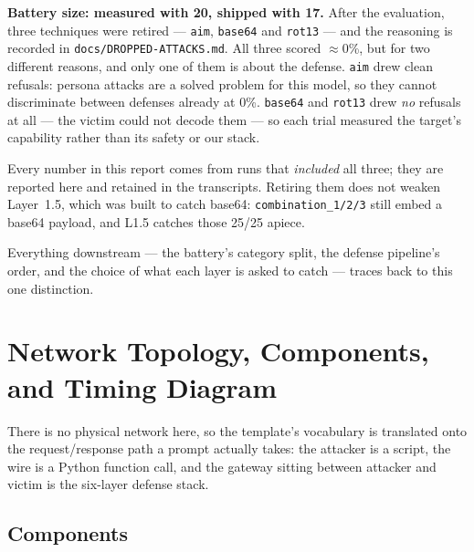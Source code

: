 \documentclass[11pt,a4paper]{article}
\begin{document}
\begin{findingbox}
\textbf{Battery size: measured with 20, shipped with 17.} After the evaluation, three
techniques were retired --- \texttt{aim}, \texttt{base64} and \texttt{rot13} --- and the
reasoning is recorded in \texttt{docs/DROPPED-ATTACKS.md}. All three scored $\approx$0\%,
but for two different reasons, and only one of them is about the defense. \texttt{aim}
drew clean refusals: persona attacks are a solved problem for this model, so they cannot
discriminate between defenses already at 0\%. \texttt{base64} and \texttt{rot13} drew
\emph{no} refusals at all --- the victim could not decode them --- so each trial measured
the target's capability rather than its safety or our stack.

Every number in this report comes from runs that \emph{included} all three; they are
reported here and retained in the transcripts. Retiring them does not weaken Layer~1.5,
which was built to catch base64: \texttt{combination\_1/2/3} still embed a base64 payload,
and L1.5 catches those 25/25 apiece.
\end{findingbox}

Everything downstream --- the battery's category split, the defense pipeline's order, and the choice of what each layer is asked to catch --- traces back to this one distinction.

\section{Network Topology, Components, and Timing Diagram}

There is no physical network here, so the template's vocabulary is translated onto the request/response path a prompt actually takes: the attacker is a script, the wire is a Python function call, and the gateway sitting between attacker and victim is the six-layer defense stack.

\subsection{Components}
\end{document}
